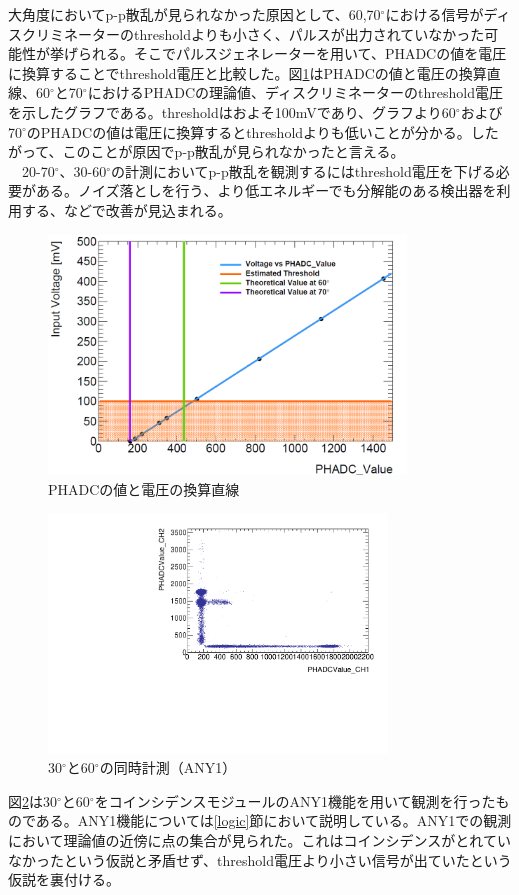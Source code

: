 \documentclass[a4paper,11pt,dvipdfmx]{jsarticle}
\begin{document}
大角度においてp-p散乱が見られなかった原因として、60,70$^\circ$における信号がディスクリミネーターのthresholdよりも小さく、パルスが出力されていなかった可能性が挙げられる。そこでパルスジェネレーターを用いて、PHADCの値を電圧に換算することでthreshold電圧と比較した。図\ref{PHADC_V}はPHADCの値と電圧の換算直線、60$^{\circ}$と70$^{\circ}$におけるPHADCの理論値、ディスクリミネーターのthreshold電圧を示したグラフである。thresholdはおよそ100mVであり、グラフより60$^{\circ}$および70$^{\circ}$のPHADCの値は電圧に換算するとthresholdよりも低いことが分かる。したがって、このことが原因でp-p散乱が見られなかったと言える。\\
　20-70$^\circ$、30-60$^\circ$の計測においてp-p散乱を観測するにはthreshold電圧を下げる必要がある。ノイズ落としを行う、より低エネルギーでも分解能のある検出器を利用する、などで改善が見込まれる。
 \begin{figure}[H]
 \centering
 \includegraphics[width=95mm]{picture/jan/parujene.png}
 \caption{PHADCの値と電圧の換算直線}
 \label{PHADC_V}
 \end{figure}
 \begin{figure}[H]
 \centering
 \includegraphics[width=90mm]{picture/jan/Ratio_09run6.pdf}
 \caption{30$^\circ$と60$^\circ$の同時計測（ANY1）}
 \label{any1}
 \end{figure}
 図\ref{any1}は30$^\circ$と60$^\circ$をコインシデンスモジュールのANY1機能を用いて観測を行ったものである。ANY1機能については\ref{logic}節において説明している。ANY1での観測において理論値の近傍に点の集合が見られた。これはコインシデンスがとれていなかったという仮説と矛盾せず、threshold電圧より小さい信号が出ていたという仮説を裏付ける。
 
\end{document}
